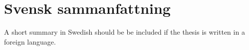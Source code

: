 
\chapter*{Svensk sammanfattning}

A short summary in Swedish should be be included if the thesis 
is written in a foreign language.
